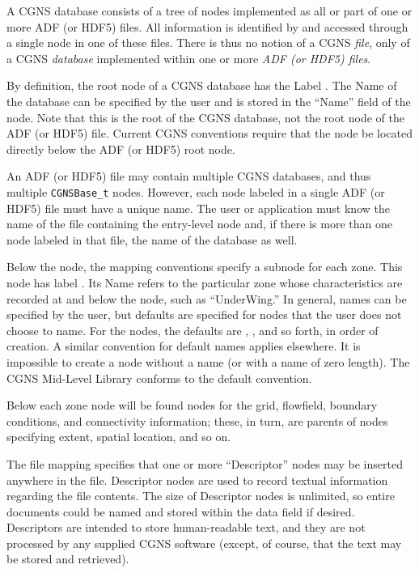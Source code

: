 A CGNS database consists of a tree of nodes implemented as all or part
of one or more ADF (or HDF5) files.
All information is identified by and accessed through a single node in
one of these files.
There is thus no notion of a CGNS \textit{file}, only of a CGNS
\textit{database} implemented within one or more \textit{ADF (or HDF5)
files}.

By definition, the root node of a CGNS database has the Label
.
The Name of the database can be specified by the user and is stored in
the ``Name'' field of the  node.
Note that this is the root of the CGNS database, not the root node of
the ADF (or HDF5) file.
Current CGNS conventions require that the  node be
located directly below the ADF (or HDF5) root node.

An ADF (or HDF5) file may contain multiple CGNS databases, and thus
multiple \texttt{CGNSBase\_t} nodes.
However, each node labeled  in a single ADF (or HDF5)
file must have a unique name.
The user or application must know the name of the file containing
the entry-level node and, if there is more than one node labeled
 in that file, the name of the database as well.

Below the  node, the mapping conventions specify a
subnode for each zone.
This node has label .
Its Name refers to the particular zone whose characteristics are
recorded at and below the node, such as ``UnderWing.''
In general, names can be specified by the user, but defaults are
specified for nodes that the user does not choose to name.
For the  nodes, the defaults are ,
, and so forth, in order of creation.
A similar convention for default names applies elsewhere.
It is impossible to create a node without a name (or with a name of zero
length).
The CGNS Mid-Level Library conforms to the default convention.

Below each zone node will be found nodes for the grid, flowfield,
boundary conditions, and connectivity information; these, in turn, are
parents of nodes specifying extent, spatial location, and so on.

The file mapping specifies that one or more ``Descriptor'' nodes may be
inserted anywhere in the file.
Descriptor nodes are used to record textual information regarding the
file contents.
The size of Descriptor nodes is unlimited, so entire documents could be
named and stored within the data field if desired.
Descriptors are intended to store human-readable text, and they are not
processed by any supplied CGNS software (except, of course, that the
text may be stored and retrieved).

